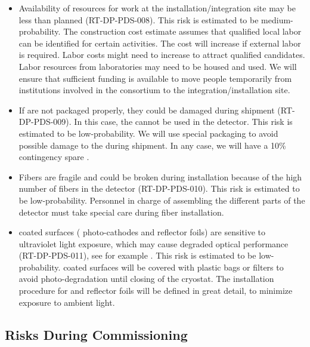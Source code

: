\begin{itemize}

\item Availability of resources for work at the installation/integration site may be less than planned (RT-DP-PDS-008). This risk is estimated to be medium-probability. The  construction cost estimate assumes that qualified local labor can be identified for certain activities.  The cost will increase if external labor is required.  Labor costs might need to increase to attract qualified candidates. Labor resources from laboratories may need to be housed and used. We will ensure that sufficient funding is available to move people temporarily from institutions involved in the  consortium to the integration/installation site.

\item If  are not packaged properly, they could be damaged during shipment (RT-DP-PDS-009). In this case, the  cannot be used in the detector. This risk is estimated to be low-probability. We will use special packaging to avoid possible damage to the  during shipment. In any case, we will have a \num{10}\% contingency spare .

\item Fibers are fragile and could be broken during installation because of the high number of fibers in the detector (RT-DP-PDS-010). This risk is estimated to be low-probability. Personnel in charge of assembling the different parts of the detector must take special care during fiber installation.

\item {} coated surfaces ( photo-cathodes and  reflector foils) are sensitive to ultraviolet light exposure, which may cause degraded optical performance (RT-DP-PDS-011), see for example \cite{Jones:2012hm}. This risk is estimated to be low-probability.  coated surfaces will be covered with plastic bags or filters to avoid photo-degradation until closing of the cryostat. The installation procedure for  and  reflector foils will be defined in great detail, to minimize exposure to ambient light. 

\end{itemize}


\subsection{Risks During Commissioning}
\label{sec:dp-pds-risks_commissioning}

